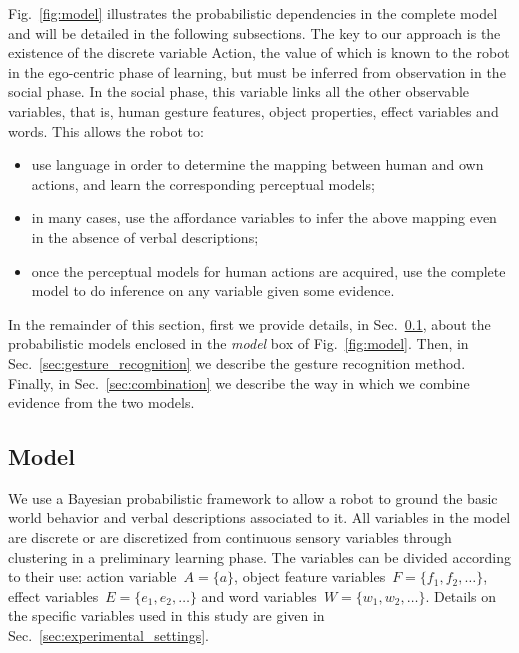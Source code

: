 Fig.~\ref{fig:model} illustrates the probabilistic dependencies in the complete model and will be detailed in the following subsections.
The key to our approach is the existence of the discrete variable Action, the value of which is known to the robot in the ego-centric phase of learning, but must be inferred from observation in the social phase.
In the social phase, this variable links all the other observable variables, that is, human gesture features, object properties, effect variables and words.
This allows the robot to:
\begin{itemize}
\item use language in order to determine the mapping between human and own actions, and learn the corresponding perceptual models;

\item in many cases, use the affordance variables to infer the above mapping even in the absence of verbal descriptions;

\item once the perceptual models for human actions are acquired, use the complete model to do inference on any variable given some evidence.
\end{itemize}
In the remainder of this section, first we provide details, in Sec.~\ref{sec:bn}, about the probabilistic models enclosed in the \emph{\AffWords{} model} box of Fig.~\ref{fig:model}.
Then, in Sec.~\ref{sec:gesture_recognition} we describe the gesture recognition method.
Finally, in Sec.~\ref{sec:combination} we describe the way in which we combine evidence from the two models. %

\subsection{\AffWords{} Model}
\label{sec:bn}
We use a Bayesian probabilistic framework to allow a robot to ground the basic world behavior and verbal descriptions associated to it.
All variables in the model are discrete or are discretized from continuous sensory variables through clustering in a preliminary learning phase.
The variables can be divided according to their use: action variable~$A = \{a\}$, object feature variables~$F=\{f_1, f_2, \dots\}$, effect variables~$E=\{e_1, e_2, \dots\}$ and word variables~$W = \{w_1, w_2, \dots\}$.
Details on the specific variables used in this study are given in Sec.~\ref{sec:experimental_settings}.

